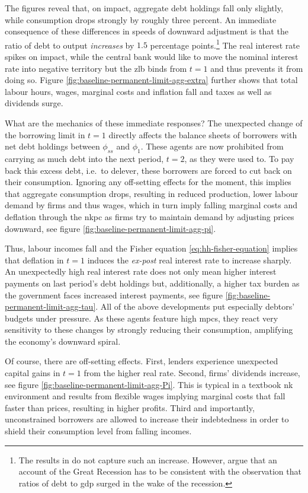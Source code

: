 \documentclass[12pt]{article} %
\numberwithin{equation}{section} %
\numberwithin{figure}{section}
\numberwithin{table}{section}
\begin{document}
The figures reveal that, on impact, aggregate debt holdings fall only slightly, while consumption drops strongly by roughly three percent. An immediate consequence of these differences in speeds of downward adjustment is that the ratio of debt to output \textit{increases} by $1.5$ percentage points.\footnote{The results in \textcite{gl2017} do not capture such an increase. However, \textcite{justiniano2015} argue that an account of the Great Recession has to be consistent with the observation that ratios of debt to \Gls{gdp} surged in the wake of the recession.} The real interest rate spikes on impact, while the central bank would like to move the nominal interest rate into negative territory but the \Gls{zlb} binds from $t=1$ and thus prevents it from doing so. Figure \ref{fig:baseline-permanent-limit-agg-extra} further shows that total labour hours, wages, marginal costs and inflation fall and taxes as well as dividends surge.

What are the mechanics of these immediate responses? The unexpected change of the borrowing limit in $t=1$ directly affects the balance sheets of borrowers with net debt holdings between $\phi_{ss}$ and $\phi_1$. These agents are now prohibited from carrying as much debt into the next period, $t=2$, as they were used to. To pay back this excess debt, i.e.~to delever, these borrowers are forced to cut back on their consumption. Ignoring any off-setting effects for the moment, this implies that aggregate consumption drops, resulting in reduced production, lower labour demand by firms and thus wages, which in turn imply falling marginal costs and deflation through the \Gls{nkpc} as firms try to maintain demand by adjusting prices downward, see figure \ref{fig:baseline-permanent-limit-agg-pi}.

Thus, labour incomes fall and the Fisher equation \eqref{eq:hh-fisher-equation} implies that deflation in $t=1$ induces the \textit{ex-post} real interest rate to increase sharply. An unexpectedly high real interest rate does not only mean higher interest payments on last period's debt holdings but, additionally, a higher tax burden as the government faces increased interest payments, see figure \ref{fig:baseline-permanent-limit-agg-tau}. All of the above developments put especially debtors' budgets under pressure. As these agents feature high \Gls{mpc}s, they react very sensitivity to these changes by strongly reducing their consumption, amplifying the economy's downward spiral.

Of course, there are off-setting effects. First, lenders experience unexpected capital gains in $t=1$ from the higher real rate. Second, firms' dividends increase, see figure \ref{fig:baseline-permanent-limit-agg-Pi}. This is typical in a textbook \Gls{nk} environment and results from flexible wages implying marginal costs that fall faster than prices, resulting in higher profits. Third and importantly, unconstrained borrowers are allowed to increase their indebtedness in order to shield their consumption level from falling incomes. 
\end{document}
